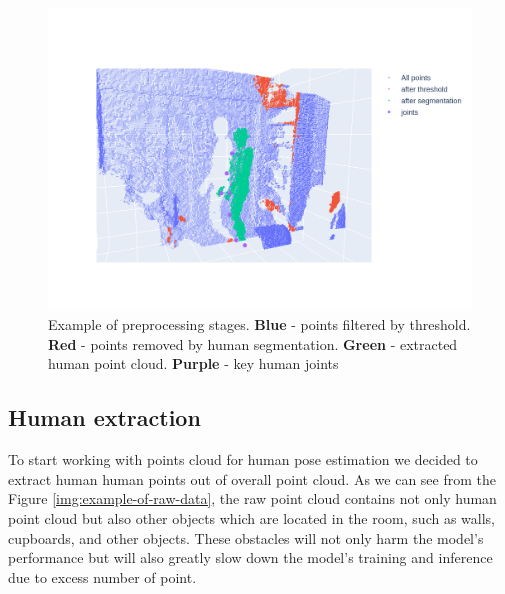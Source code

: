 \begin{figure}[htbp]
    \hspace*{-1cm}                                                           
        \includegraphics[trim=0 200 450 200,clip,scale=0.25]{Figures/example-all-parts.png}
    \caption{Example of preprocessing stages. \textbf{Blue} - points filtered by threshold. \textbf{Red} - points removed by human segmentation. \textbf{Green} - extracted human point cloud. \textbf{Purple} - key human joints}
    \label{img:example-of-all-parts}
\end{figure}

\subsection{Human extraction}
To start working with points cloud for human pose estimation we decided to extract human human points out of overall point cloud. As we can see from the Figure \ref{img:example-of-raw-data}, the raw point cloud contains not only human point cloud but also other objects which are located in the room, such as walls, cupboards, and other objects. These obstacles will not only harm the model's performance but will also greatly slow down the model's training and inference due to excess number of point.

